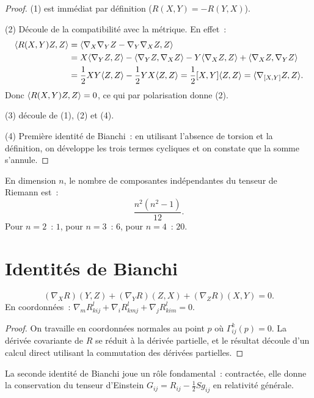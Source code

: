 \begin{proof}
(1) est imm\'ediat par d\'efinition ($R(X,Y) = -R(Y,X)$).

(2) D\'ecoule de la compatibilit\'e avec la m\'etrique. En effet~:
\begin{align*}
    \langle R(X,Y)Z, Z \rangle &= \langle \nabla_X\nabla_Y Z - \nabla_Y\nabla_X Z, Z \rangle \\
    &= X\langle \nabla_Y Z, Z \rangle - \langle \nabla_Y Z, \nabla_X Z \rangle
    - Y\langle \nabla_X Z, Z \rangle + \langle \nabla_X Z, \nabla_Y Z \rangle \\
    &= \frac{1}{2}XY\langle Z, Z \rangle - \frac{1}{2}YX\langle Z, Z \rangle
    = \frac{1}{2}[X,Y]\langle Z, Z \rangle = \langle \nabla_{[X,Y]}Z, Z \rangle.
\end{align*}
Donc $\langle R(X,Y)Z, Z \rangle = 0$, ce qui par polarisation donne (2).

(3) d\'ecoule de (1), (2) et (4).

(4) Premi\`ere identit\'e de Bianchi~: en utilisant l'absence de torsion et la
d\'efinition, on d\'eveloppe les trois termes cycliques et on constate que la somme
s'annule.
\end{proof}

\begin{proposition}
En dimension $n$, le nombre de composantes ind\'ependantes du tenseur de Riemann est~:
\[
    \frac{n^2(n^2-1)}{12}.
\]
Pour $n = 2$~: $1$, pour $n = 3$~: $6$, pour $n = 4$~: $20$.
\end{proposition}

\section{Identit\'es de Bianchi}

\begin{theoreme}
\[
    (\nabla_X R)(Y,Z) + (\nabla_Y R)(Z,X) + (\nabla_Z R)(X,Y) = 0.
\]
En coordonn\'ees~: $\nabla_m R^l_{kij} + \nabla_i R^l_{kmj} + \nabla_j R^l_{kim} = 0$.
\end{theoreme}

\begin{proof}
On travaille en coordonn\'ees normales au point $p$ o\`u $\Gamma^k_{ij}(p) = 0$.
La d\'eriv\'ee covariante de $R$ se r\'eduit \`a la d\'eriv\'ee partielle, et le r\'esultat
d\'ecoule d'un calcul direct utilisant la commutation des d\'eriv\'ees partielles.
\end{proof}

\begin{remarque}
La seconde identit\'e de Bianchi joue un r\^ole fondamental~: contract\'ee, elle
donne la conservation du tenseur d'Einstein $G_{ij} = R_{ij} - \frac{1}{2}Sg_{ij}$
en relativit\'e g\'en\'erale.
\end{remarque}

